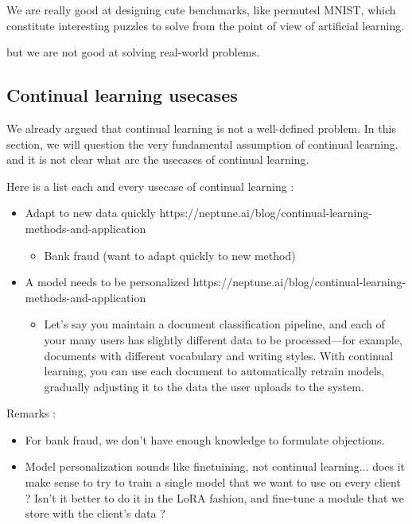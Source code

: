\documentclass[twocolumn]{article}
\begin{document}
We are really good at designing cute benchmarks, like permuted MNIST, which constitute interesting puzzles to solve from the point of view of artificial learning.

but we are not good at solving real-world problems.

\subsection{Continual learning usecases}

We already argued that continual learning is not a well-defined problem. In this section, we will question the very fundamental assumption of continual learning. and it is not clear what are the usecases of continual learning.

Here is a list each and every usecase of continual learning :
\begin{itemize}
    \item Adapt to new data quickly https://neptune.ai/blog/continual-learning-methods-and-application
        \begin{itemize}
            \item Bank fraud (want to adapt quickly to new method)
        \end{itemize}
    \item A model needs to be personalized https://neptune.ai/blog/continual-learning-methods-and-application
        \begin{itemize}
            \item Let’s say you maintain a document classification pipeline, and each of your many users has slightly different data to be processed—for example, documents with different vocabulary and writing styles. With continual learning, you can use each document to automatically retrain models, gradually adjusting it to the data the user uploads to the system.
        \end{itemize}
\end{itemize}

Remarks :
\begin{itemize}
    \item For bank fraud, we don't have enough knowledge to formulate objections.
    \item Model personalization sounds like finetuining, not continual learning... does it make sense to try to train a single model that we want to use on every client ? Isn't it better to do it in the LoRA fashion, and fine-tune a module that we store with the  client's data ?
\end{itemize}
\end{document}
